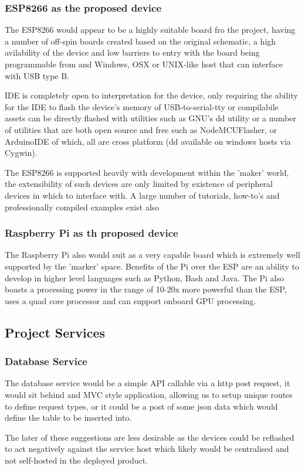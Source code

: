 \documentclass{article}
\begin{document}
        \subsubsection{ESP8266 as the proposed device}
        The ESP8266\cite{ESP8266} would appear to be a highly suitable board fro the project, having
        a number of off-spin boards created based on the original schematic, a high avilability of the
        device and low barriers to entry with the board being programmable from and Windows, OSX or UNIX-like
        host that can interface with USB type B.
        \par
        IDE is completely open to interpretation for the device, only requiring the ability for the IDE to flash
        the device's memory of USB-to-serial-tty or compilabile assets can be directly flashed with utilities such
        as GNU's dd utility or a number of utilities that are both open source and free such as NodeMCUFlasher\cite{NodeMCU}, or
        ArduinoIDE\cite{ArduinoIDE} of which, all are cross platform (dd available on windows hosts via Cygwin).
        \par
        The ESP8266\cite{ESP8266} is supported heavily with development within the 'maker' world, the extensibility
        of such devices are only limited by existence of peripheral devices in which to interface with.
        A large number of tutorials, how-to's and professionally compiled examples exist also\cite{ESP8266-How-To}

        \subsubsection{Raspberry Pi as th proposed device}
        The Raspberry Pi\cite{RaspberryPi} also would suit as a very capable board which is extremely well supported 
        by the 'marker' space. Benefits of the Pi over the ESP are an ability to develop in higher level languages
        such as Python, Bash and Java. The Pi also boasts a processing power in the range of 10-20x more powerful than the 
        ESP, uses a quad core processor and can support onboard GPU processing.
        \\

        \subsection{Project Services}
            \subsubsection{Database Service}
            The database service would be a simple API callable via a http post request, it would sit behind 
            and MVC style application, allowing us to setup unique routes to define request types, or it could
            be a post of some json data which would define the table to be inserted into.
            \par
            The later of these suggestions are less desirable as the devices could be reflashed to act 
            negatively against the service host which likely would be centralised and not self-hosted in the
            deployed product.
\end{document}
